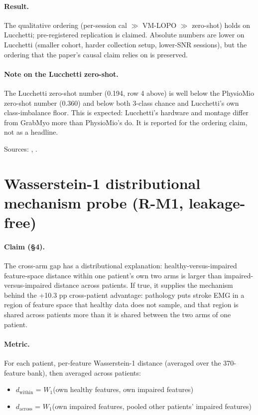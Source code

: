\documentclass{article}
\begin{document}
\paragraph{Result.} The qualitative ordering (per-session cal $\gg$ VM-LOPO $\gg$ zero-shot) holds on Lucchetti; pre-registered replication is claimed. Absolute numbers are lower on Lucchetti (smaller cohort, harder collection setup, lower-SNR sessions), but the ordering that the paper's causal claim relies on is preserved.

\paragraph{Note on the Lucchetti zero-shot.} The Lucchetti zero-shot number (0.194, row 4 above) is well below the PhysioMio zero-shot number (0.360) and below both 3-class chance and Lucchetti's own class-imbalance floor. This is expected: Lucchetti's hardware and montage differ from GrabMyo more than PhysioMio's do. It is reported for the ordering claim, not as a headline.

Sources: , .

\section{Wasserstein-1 distributional mechanism probe (R-M1, leakage-free)}
\label{app:wasserstein}

\paragraph{Claim (\S 4).} The cross-arm gap has a distributional explanation: healthy-versus-impaired feature-space distance within one patient's own two arms is larger than impaired-versus-impaired distance across patients. If true, it supplies the mechanism behind the +10.3 pp cross-patient advantage: pathology puts stroke EMG in a region of feature space that healthy data does not sample, and that region is shared across patients more than it is shared between the two arms of one patient.

\paragraph{Metric.} For each patient, per-feature Wasserstein-1 distance (averaged over the 370-feature bank), then averaged across patients:
\begin{itemize}
  \item $d_{\mathrm{within}}$ = $W_1$(own healthy features, own impaired features)
  \item $d_{\mathrm{across}}$ = $W_1$(own impaired features, pooled other patients' impaired features)
\end{itemize}
\end{document}
